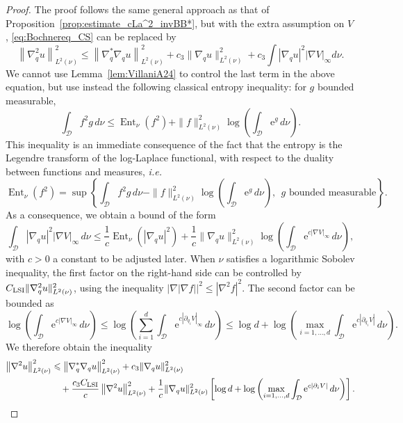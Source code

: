 \documentclass{article}
\newcommand{\rme}{\mathrm{e}}
\newcommand{\cD}{\mathcal{D}}
\renewcommand{\leq}{\leqslant}
\begin{document}
\begin{proof}
The proof follows the same general approach as that of Proposition~\ref{prop:estimate_cLa^2_invBB*}, but with the extra assumption on $V$, \eqref{eq:Bochnereq_CS} can be replaced by 
\begin{equation}
    \left\|\nabla_q^2 u\right\|_{L^2(\nu)}^2 \leq \left\|\nabla_q^{*}\nabla_q u \right\|_{L^2(\nu)}^2+ c_{3}\|\nabla_q u\|_{L^2(\nu)}^2 + c_{3}\int{|\nabla_q u|^2|\nabla V|_{\infty}d\nu}.
\end{equation}
We cannot use Lemma~\ref{lem:VillaniA24} to control the last term in the above equation, but use instead the following classical entropy inequality: for $g$ bounded measurable, 
\[
\int_\cD f^2g \, d\nu \leq \operatorname{Ent}_{\nu}(f^2) + \|f\|_{L^2(\nu)}^2\log \left( \int_\cD \rme^{g} \, d\nu \right).
\]
This inequality is an immediate consequence of the fact that the entropy is the Legendre transform of the log-Laplace functional, with respect to the duality between functions and measures, \emph{i.e.}
\[
\operatorname{Ent}_{\nu}(f^2) = \sup \left\{ \int_\cD f^2 g \, d\nu - \|f\|_{L^2(\nu)}^2\log \left(\int_\cD \rme^{g} \, d\nu\right), \ \ g \textrm{ bounded measurable} \right\}.
\]
As a consequence, we obtain a bound of the form 
\[
\int_\cD |\nabla_q u|^2|\nabla V|_{\infty} \, d\nu \leq \frac1c \operatorname{Ent}_{\nu}(|\nabla_q u|^2) + \frac1c \|\nabla_q u\|_{L^2(\nu)}^2 \log \left(\int_\cD \rme^{c |\nabla V|_{\infty}} \, d\nu\right),
\]
with $c>0$ a constant to be adjusted later. When $\nu$ satisfies a logarithmic Sobolev inequality, the first factor on the right-hand side can be controlled by $C_{\rm LSI}\|\nabla^2_q u\|^2_{L^2(\nu)}$, using the inequality $\left|\nabla |\nabla f|\right|^2 \leq |\nabla^2 f|^2$. The second factor can be bounded as
\[
\log \left( \int_\cD \rme^{c|\nabla V|_{\infty}} \, d\nu\right) \leq \log \left( \sum_{i=1}^d \int_\cD \rme^{c|\partial_{q_i} V|_{\infty}} \, d\nu\right) \leq \log d + \log\left( \max_{i=1,\dots,d} \int_\cD \rme^{c|\partial_{q_i} V|} \, d\nu \right).
\]
We therefore obtain the inequality
\begin{equation}
\begin{aligned}
    \left\|\nabla^2 u\right\|_{L^2(\nu)}^2 & \leq \left\|\nabla_q^{*}\nabla_q u \right\|_{L^2(\nu)}^2+ c_{3}\|\nabla_q u\|_{L^2(\nu)}^2 \\ 
    & \ \ \ + \frac{c_{3}C_{\rm LSI}}{c} \left\|\nabla^2 u\right\|_{L^2(\nu)}^2 + \frac1c \|\nabla_q u\|_{L^2(\nu)}^2 \left[\log d + \log\left( \max_{i=1,\dots,d} \int_\cD \rme^{c|\partial_i V|} \, d\nu \right)\right].

\end{aligned}
\end{equation}
\end{proof}
\end{document}
